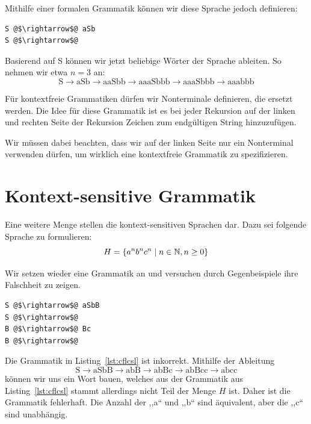 Mithilfe einer formalen Grammatik können wir diese Sprache jedoch definieren:
\begin{lstlisting}
S @$\rightarrow$@ aSb
S @$\rightarrow$@
\end{lstlisting}

Basierend auf S können wir jetzt beliebige Wörter der Sprache ableiten. So nehmen wir etwa $n=3$ an:
\[
  \text{S} \rightarrow \text{aSb} \rightarrow \text{aaSbb} \rightarrow
  \text{aaaSbbb} \rightarrow \text{aaaSbbb} \rightarrow \text{aaabbb}
\]

Für kontextfreie Grammatiken dürfen wir Nonterminale definieren, die ersetzt werden. Die Idee für diese Grammatik ist es bei jeder Rekursion auf der linken und rechten Seite der Rekursion Zeichen zum endgültigen String hinzuzufügen.

Wir müssen dabei beachten, dass wir auf der linken Seite nur ein Nonterminal verwenden dürfen, um wirklich eine kontextfreie Grammatik zu spezifizieren.

\section{Kontext-sensitive Grammatik}
%
Eine weitere Menge stellen die kontext-sensitiven Sprachen dar. Dazu sei folgende Sprache zu formulieren:
\[
  H = \left\{a^n b^n c^n \mid n \in \mathbb{N}, n \geq 0\right\}
\]

Wir setzen wieder eine Grammatik an und versuchen durch Gegenbeispiele ihre Falschheit zu zeigen.
\begin{lstlisting}
S @$\rightarrow$@ aSbB
S @$\rightarrow$@
B @$\rightarrow$@ Bc
B @$\rightarrow$@
\end{lstlisting}

Die Grammatik in Listing~\ref{lst:cflcsl} ist inkorrekt. Mithilfe der Ableitung
\[
  \text{S} \rightarrow \text{aSbB} \rightarrow \text{abB} \rightarrow 
  \text{abBc} \rightarrow \text{abBcc} \rightarrow \text{abcc}
\]
können wir uns ein Wort bauen, welches aus der Grammatik aus Listing~\ref{lst:cflcsl} stammt allerdings nicht Teil der Menge $H$ ist. Daher ist die Grammatik fehlerhaft. Die Anzahl der ,,a`` und ,,b`` sind äquivalent, aber die ,,c`` sind unabhängig.

